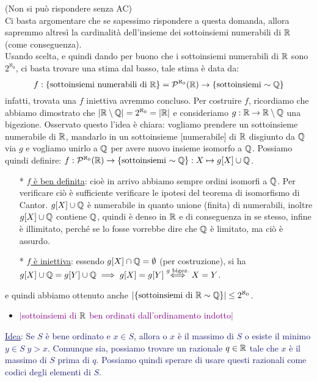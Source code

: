 \begin{soln}
	(Non si può rispondere senza AC)\\
	Ci basta argomentare che se sapessimo rispondere a questa domanda, allora sapremmo altresì la cardinalità dell'insieme dei sottoinsiemi numerabili di $\mathbb R$ (come conseguenza).\\
	Usando scelta, e quindi dando per buono che i sottoinsiemi numerabili di $\mathbb R$ sono $2^{\aleph_0}$, ci basta trovare una stima dal basso, tale stima è data da:
	\[ f : \{\text{sottoinsiemi numerabili di $\mathbb R$}\} = \mathcal{P}^{\aleph_0}(\mathbb R) \to \{\text{sottoinsiemi $\sim \mathbb Q$}\}
		\]
	infatti, trovata una $f$ iniettiva avremmo concluso. Per costruire $f$, ricordiamo che abbiamo dimostrato che $|\mathbb R \setminus \mathbb Q| = 2^{\aleph_0} = |\mathbb R|$ e consideriamo $g : \mathbb R \to \mathbb R \setminus \mathbb Q$ una bigezione.
	Osservato questo l'idea è chiara: vogliamo prendere un sottoinsieme numerabile di $\mathbb R$, mandarlo in un sottoinsieme [numerabile] di $\mathbb R$ disgiunto da $\mathbb Q$ via $g$ e vogliamo unirlo a $\mathbb Q$ per avere nuovo insieme isomorfo a $\mathbb Q$.
	Possiamo quindi definire: $f : \mathcal{P}^{\aleph_0}(\mathbb R) \to \{\text{sottoinsiemi $\sim \mathbb Q$}\} : X \mapsto g[X] \cup \mathbb Q$.
	\begin{itemize}
		\item[*] \underline{$f$ è ben definita}: cioè in arrivo abbiamo sempre ordini isomorfi a $\mathbb Q$. Per verificare ciò è sufficiente verificare le ipotesi del teorema di isomorfismo di Cantor. $g[X] \cup \mathbb Q$ è numerabile in quanto unione (finita) di numerabili, inoltre $g[X] \cup \mathbb Q$ contiene $\mathbb Q$, quindi è denso in $\mathbb R$ e di conseguenza
		in se stesso, infine è illimitato, perché se lo fosse vorrebbe dire che $\mathbb Q$ è limitato, ma ciò è assurdo.
		\item[*] \underline{$f$ è iniettiva}: essendo $g[X] \cap \mathbb Q = \emptyset$ (per costruzione), si ha $g[X] \cup \mathbb Q = g[Y] \cup \mathbb Q \implies g[X] = g[Y] \overset{\text{$g$ bigez.}}{\iff} X = Y$.
	\end{itemize}
	e quindi abbiamo ottenuto anche $|\{\text{sottoinsiemi di $\mathbb R \sim \mathbb Q$}\}| \leq 2^{\aleph_0}$.
\end{soln}

\begin{itemize}
	\item \textcolor{purple}{$|$sottoinsiemi di $\mathbb R$ ben ordinati dall'ordinamento indotto$|$}
\end{itemize}

\textcolor{MidnightBlue}{\underline{Idea}: Se $S$ è bene ordinato e $x \in S$, allora o $x$ è il massimo di $S$ o esiste il minimo $y \in S \; y > x$. Comunque sia, possiamo trovare un razionale $q \in \mathbb R$ tale che $x$ è il massimo di $S$ prima di $q$.
Possiamo quindi sperare di usare questi razionali come codici degli elementi di $S$.} 

